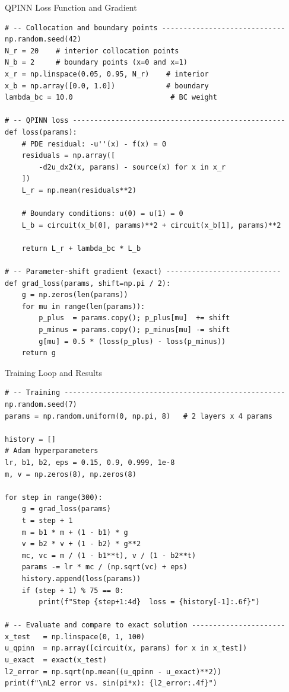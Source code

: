 \documentclass[aspectratio=169,10pt]{beamer}
\begin{document}
\begin{frame}[fragile]{QPINN Loss Function and Gradient}
  \begin{lstlisting}
# -- Collocation and boundary points -----------------------------
np.random.seed(42)
N_r = 20    # interior collocation points
N_b = 2     # boundary points (x=0 and x=1)
x_r = np.linspace(0.05, 0.95, N_r)    # interior
x_b = np.array([0.0, 1.0])            # boundary
lambda_bc = 10.0                       # BC weight

# -- QPINN loss --------------------------------------------------
def loss(params):
    # PDE residual: -u''(x) - f(x) = 0
    residuals = np.array([
        -d2u_dx2(x, params) - source(x) for x in x_r
    ])
    L_r = np.mean(residuals**2)

    # Boundary conditions: u(0) = u(1) = 0
    L_b = circuit(x_b[0], params)**2 + circuit(x_b[1], params)**2

    return L_r + lambda_bc * L_b

# -- Parameter-shift gradient (exact) ---------------------------
def grad_loss(params, shift=np.pi / 2):
    g = np.zeros(len(params))
    for mu in range(len(params)):
        p_plus  = params.copy(); p_plus[mu]  += shift
        p_minus = params.copy(); p_minus[mu] -= shift
        g[mu] = 0.5 * (loss(p_plus) - loss(p_minus))
    return g
  \end{lstlisting}
\end{frame}

\begin{frame}[fragile]{Training Loop and Results}
  \begin{lstlisting}
# -- Training ----------------------------------------------------
np.random.seed(7)
params = np.random.uniform(0, np.pi, 8)   # 2 layers x 4 params

history = []
# Adam hyperparameters
lr, b1, b2, eps = 0.15, 0.9, 0.999, 1e-8
m, v = np.zeros(8), np.zeros(8)

for step in range(300):
    g = grad_loss(params)
    t = step + 1
    m = b1 * m + (1 - b1) * g
    v = b2 * v + (1 - b2) * g**2
    mc, vc = m / (1 - b1**t), v / (1 - b2**t)
    params -= lr * mc / (np.sqrt(vc) + eps)
    history.append(loss(params))
    if (step + 1) % 75 == 0:
        print(f"Step {step+1:4d}  loss = {history[-1]:.6f}")

# -- Evaluate and compare to exact solution ----------------------
x_test   = np.linspace(0, 1, 100)
u_qpinn  = np.array([circuit(x, params) for x in x_test])
u_exact  = exact(x_test)
l2_error = np.sqrt(np.mean((u_qpinn - u_exact)**2))
print(f"\nL2 error vs. sin(pi*x): {l2_error:.4f}")
  \end{lstlisting}
\end{frame}
\end{document}
